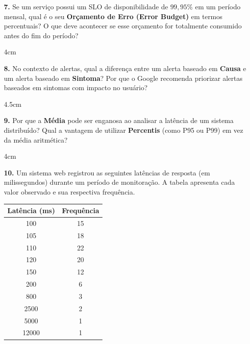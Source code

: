 \documentclass[12pt]{article}
\begin{document}
\textbf{7.} Se um serviço possui um SLO de disponibilidade de $99,95\%$ em um período mensal, qual é o seu \textbf{Orçamento de Erro (Error Budget)} em termos percentuais? O que deve acontecer se esse orçamento for totalmente consumido antes do fim do período?
\begin{resposta}{4cm}
\end{resposta}

\textbf{8.} No contexto de alertas, qual a diferença entre um alerta baseado em \textbf{Causa} e um alerta baseado em \textbf{Sintoma}? Por que o Google recomenda priorizar alertas baseados em sintomas com impacto no usuário?
\begin{resposta}{4.5cm}
\end{resposta}

\textbf{9.} Por que a \textbf{Média} pode ser enganosa ao analisar a latência de um sistema distribuído? Qual a vantagem de utilizar \textbf{Percentis} (como P95 ou P99) em vez da média aritmética?
\begin{resposta}{4cm}
\end{resposta}

\textbf{10.} Um sistema web registrou as seguintes latências de resposta (em milissegundos) durante um período de monitoração. A tabela apresenta cada valor observado e sua respectiva frequência.

\begin{center}
\begin{tabular}{c|c}
\textbf{Latência (ms)} & \textbf{Frequência} \\
\hline
100 & 15 \\
105 & 18 \\
110 & 22 \\
120 & 20 \\
150 & 12 \\
200 & 6 \\
800 & 3 \\
2500 & 2 \\
5000 & 1 \\
12000 & 1 \\
\end{tabular}
\end{center}
\end{document}
